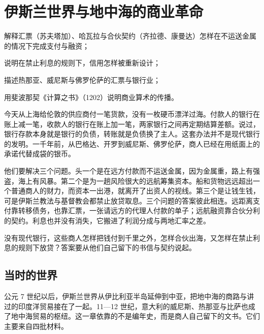 \chapter{伊斯兰世界与地中海的商业革命}\label{ch:islamic}

\begin{chapterguide}
\begin{guidegoals}
\item 解释汇票（苏夫塔加）、哈瓦拉与合伙契约（齐拉德、康曼达）怎样在不运送金属的情况下完成支付与融资；
\item 说明在禁止利息的规则下，信用怎样被重新设计；
\item 描述热那亚、威尼斯与佛罗伦萨的汇票与银行业；
\item 用斐波那契《计算之书》（1202）说明商业算术的传播。
\end{guidegoals}
\end{chapterguide}

今天从上海给伦敦的供应商付一笔货款，没有一枚硬币漂洋过海。付款人的银行在账上减一笔，收款人的银行在账上加一笔，两家银行之间再定期结算差额。说过，银行存款本身就是银行的负债，转账就是负债换了主人。这套办法并不是现代银行的发明。一千年前，从巴格达、开罗到威尼斯、佛罗伦萨，商人已经在用纸面上的承诺代替成袋的银币。

他们要解决三个问题。头一个是在远方付款而不运送金属，因为金属重，路上有强盗，海上有风暴。第二个是为一趟风险很大的远航筹集资本。船和货物远远超出一个普通商人的财力，而资本一出港，就离开了出资人的视线。第三个是让钱生钱，可是伊斯兰教法与基督教会都禁止放贷取息。三个问题的答案彼此相连。远距离支付靠转移债务，也靠汇票，一张请远方的代理人付款的单子；远航融资靠合伙分利的契约。利息也并没有消失，它搬进了利润分成与两地汇率之差。

没有现代银行，这些商人怎样把钱付到千里之外，怎样合伙出海，又怎样在禁止利息的规则下放贷？答案要从他们自己留下的书信与契约说起。

\section{当时的世界}\label{sec:islamic-world}

公元 7 世纪以后，伊斯兰世界从伊比利亚半岛延伸到中亚，把地中海的商路与讲过的印度洋贸易接在了一起。11—12 世纪，意大利的威尼斯、热那亚与比萨也成了地中海贸易的枢纽。这一章依靠的不是编年史，而是商人自己留下的文书。它们主要来自四批材料。

